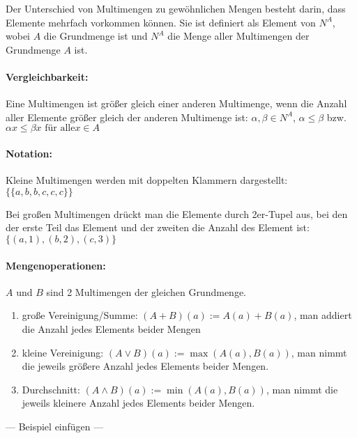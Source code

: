 Der Unterschied von Multimengen zu gewöhnlichen Mengen besteht darin,
dass Elemente mehrfach vorkommen können. Sie ist definiert als Element
von $N^A$, wobei $A$ die Grundmenge ist und $N^A$ die Menge aller
Multimengen der Grundmenge $A$ ist.

\paragraph{Vergleichbarkeit:} Eine Multimengen ist größer gleich einer anderen Multimenge, wenn die
Anzahl aller Elemente größer gleich der anderen Multimenge ist:
$\alpha, \beta \in N^A$, $\alpha \le \beta$ bzw. $\alpha x \le \beta x \text{ für alle
} x \in A$

\paragraph{Notation:} Kleine Multimengen werden mit doppelten
Klammern dargestellt: $\{\{a,b,b,c,c,c\}\}$

Bei großen Multimengen drückt man die Elemente durch 2er-Tupel aus, bei
den der erste Teil das Element und der zweiten die Anzahl des Element
ist: $\{(a,1),(b,2),(c,3)\}$


\paragraph{Mengenoperationen:}
$A$ und $B$ sind 2 Multimengen der gleichen Grundmenge.
\begin{enumerate}
\item große Vereinigung/Summe: $(A + B)(a) := A(a) + B(a)$, man
  addiert die Anzahl jedes Elements beider Mengen
\item kleine Vereinigung: $(A \vee B)(a) := \max(A(a), B(a))$, man
  nimmt die jeweils größere Anzahl jedes Elements beider Mengen.
\item Durchschnitt: $(A \wedge B)(a) := \min(A(a), B(a))$, man nimmt die
  jeweils kleinere Anzahl jedes Elements beider Mengen.
\end{enumerate}

--- Beispiel einfügen ---

